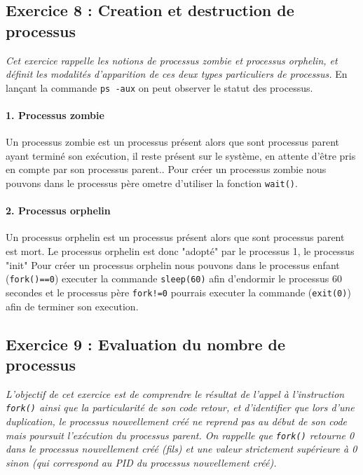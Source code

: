 \inputminted[linenos,firstline=9, lastline=30]{cpp}{../sources/cpp/TP5-6/ex7-fork2.c}

\subsection{Exercice 8 : Creation et destruction de processus}
\textit{Cet exercice rappelle les notions de processus zombie et processus orphelin, et définit les modalités d’apparition de ces deux types particuliers de processus.}
En lançant la commande \texttt{ps -aux} on peut observer le statut des processus.

\paragraph{1. Processus zombie}
Un processus zombie est un processus présent alors que sont processus parent ayant terminé son exécution, il reste présent sur le système, en attente d'être pris en compte par son processus parent..
Pour créer un processus zombie nous pouvons dans le processus père ometre d'utiliser la fonction \texttt{wait()}.

\paragraph{2. Processus orphelin}
Un processus orphelin est un processus présent alors que sont processus parent est mort. Le processus orphelin est donc "adopté" par le processus 1, le processus "init"
Pour créer un processus orphelin nous pouvons dans le processus enfant (\texttt{fork()==0}) executer la commande \texttt{sleep(60)} afin d'endormir le processus 60 secondes et le processus père \texttt{fork!=0} pourrais executer la commande (\texttt{exit(0)}) afin de terminer son execution.

\subsection{Exercice 9 : Evaluation du nombre de processus}
\textit{L’objectif de cet exercice est de comprendre le résultat de l’appel à l’instruction \texttt{fork()} ainsi que la particularité de son code retour, et d’identifier que lors d’une duplication, le processus nouvellement créé ne reprend pas au début de son code mais poursuit l’exécution du processus parent. On rappelle que \texttt{fork()} retourne 0 dans le processus nouvellement créé (fils) et une valeur strictement supérieure à 0 sinon (qui correspond au PID du processus nouvellement créé).}

